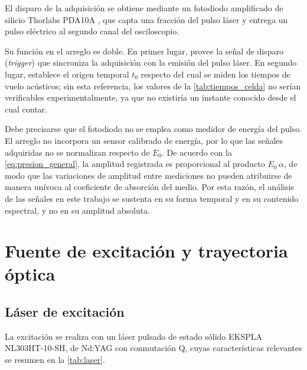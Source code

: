 El disparo de la adquisición se obtiene mediante un fotodiodo
amplificado de silicio Thorlabs PDA10A \cite{Rangel2023}, que capta
una fracción del pulso láser y entrega un pulso eléctrico al segundo
canal del osciloscopio.

Su función en el arreglo es doble. En primer lugar, provee la señal
de disparo (\textit{trigger}) que sincroniza la adquisición con la
emisión del pulso láser. En segundo lugar, establece el origen
temporal $t_0$ respecto del cual se miden los tiempos de vuelo
acústicos; sin esta referencia, los valores de la
\cref{tab:tiempos_celda} no serían verificables experimentalmente,
ya que no existiría un instante conocido desde el cual contar.

Debe precisarse que el fotodiodo no se emplea como medidor de energía
del pulso. El arreglo no incorpora un sensor calibrado de energía,
por lo que las señales adquiridas no se normalizan respecto de $E_0$.
De acuerdo con la \cref{eq:presion_general}, la amplitud registrada
es proporcional al producto $E_0\,\alpha$, de modo que las
variaciones de amplitud entre mediciones no pueden atribuirse de
manera unívoca al coeficiente de absorción del medio. Por esta razón,
el análisis de las señales en este trabajo se sustenta en su forma
temporal y en su contenido espectral, y no en su amplitud absoluta.

\section{Fuente de excitación y trayectoria óptica}
\label{sec:excitacion}

\subsection*{Láser de excitación}

La excitación se realiza con un láser pulsado de estado sólido
EKSPLA NL303HT-10-SH, de Nd:YAG con conmutación Q, cuyas
características relevantes se resumen en la \cref{tab:laser}.


